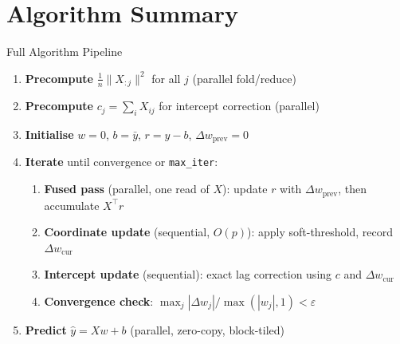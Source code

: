 \documentclass[aspectratio=169]{beamer}
\begin{document}
\section{Algorithm Summary}

\begin{frame}{Full Algorithm Pipeline}
  \begin{enumerate}
    \item \textbf{Precompute} $\tfrac{1}{n}\|X_{:j}\|^2$ for all $j$ (parallel fold/reduce)
    \item \textbf{Precompute} $c_j = \sum_i X_{ij}$ for intercept correction (parallel)
    \item \textbf{Initialise} $w=0$, $b=\bar{y}$, $r = y - b$, $\Delta w_{\text{prev}}=0$
    \item \textbf{Iterate} until convergence or \texttt{max\_iter}:
    \begin{enumerate}
      \item \textbf{Fused pass} (parallel, one read of $X$):
            update $r$ with $\Delta w_{\text{prev}}$, then accumulate $X^\top r$
      \item \textbf{Coordinate update} (sequential, $O(p)$):
            apply soft-threshold, record $\Delta w_{\text{cur}}$
      \item \textbf{Intercept update} (sequential):
            exact lag correction using $c$ and $\Delta w_{\text{cur}}$
      \item \textbf{Convergence check}: $\max_j |\Delta w_j| / \max(|w_j|, 1) < \varepsilon$
    \end{enumerate}
    \item \textbf{Predict} $\hat{y} = Xw + b$ (parallel, zero-copy, block-tiled)
  \end{enumerate}
\end{frame}
\end{document}
